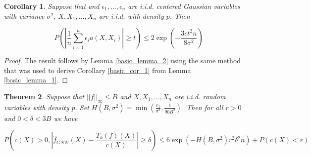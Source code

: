 \documentclass{article}
\newtheorem{theorem}{Theorem}[section]
\newtheorem{corollary}[theorem]{Corollary}
\begin{document}
\begin{corollary}
\label{basic_cor_2}
Suppose that and $\epsilon_1,...,\epsilon_n$ are i.i.d. centered Gaussian variables with variance $\sigma^2$, $X,X_1,...,X_n$ are i.i.d. with density $p$. Then
 
 \begin{equation*}
    P(|\frac{1}{n}\sum_{i=1}^n \epsilon_ia(X,X_i)|\geq t)\leq 2\exp(-\frac{3ct^2n}{8\sigma^2})
 \end{equation*}
\end{corollary}
 \begin{proof}
 The result follows by Lemma  \ref{basic_lemma_2}  using the same method that was used to derive Corollary \ref{basic_cor_1} from Lemma \ref{basic_lemma_1}. 
 \end{proof}

\begin{theorem}
\label{thm_2}
Suppose that $||f||_{\infty}\leq B$ and 
$X,X_1,...,X_n$ are i.i.d. random variables 
with density $p$.
Set $H(B,\sigma^2)=\min(\frac{c_1}{\sigma^2},\frac{1}{90B^2})$. Then 
for all $r>0$ and $0<\delta<3B$ we have 

\begin{equation*}
    P(c(X)>0,|\hat{f}_{GNW}(X)-\frac{T_k(f)(X)}{c(X)}|\geq\delta)\leq 6\exp(-H(B,\sigma^2)r^2\delta^2n)+P(c(X)<r)
\end{equation*}

\end{theorem}
\end{document}

